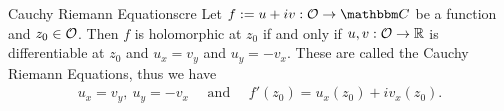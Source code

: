 \documentclass[../ComplexAnalysis_Notes.tex]{subfiles}
\begin{document}
\begin{Thm}{Cauchy Riemann Equations}{cre}
  Let $f := u + iv : \mO \to \C$ be a function and $z_0 \in \mathcal{O}$. Then $f$ is holomorphic at $z_0$ if and only if $u,v : \mathcal{O} \to \mathbb{R}$ is differentiable at $z_0$ and $u_x = v_y$ and $u_y = - v_x$. These are called the Cauchy Riemann Equations, thus we have
  \begin{align*}
    u_x = v_y, \ u_y = -v_x \quad \mbox{ and } \quad f'(z_0) = u_x(z_0) + i v_x(z_0).
  \end{align*}
\end{Thm}
\end{document}
